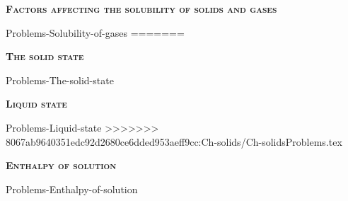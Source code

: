 \documentclass[main.tex]{subfiles}
\newcommand\chapterlabel{Ch-solids}
\begin{document}
\begin{multicols*}{2}
{\raggedright\textsc{\textbf{Factors affecting the solubility of solids and gases }}\par}
{Problems-Solubility-of-gases}
=======
{\raggedright\textsc{\textbf{The solid state }}\par}
{Problems-The-solid-state}
{\raggedright\textsc{\textbf{Liquid state }}\par}
{Problems-Liquid-state}
>>>>>>> 8067ab9640351edc92d2680ce6dded953aeff9cc:Ch-solids/Ch-solidsProblems.tex

{\raggedright\textsc{\textbf{Enthalpy of solution }}\par}
{Problems-Enthalpy-of-solution}


\end{multicols*} \iftoggle{showfinalanswers}{
\newpage\fancyhfoffset[E,O]{0pt}
\begin{answerbox}
\begin{answersenvironment}
 \begin{localsize}{10}
{ \checkoddpage\ifoddpage    \else   \clearpage\thispagestyle{empty}\mbox{}\clearpage\fi
\Large \bf Answers}
\SetupExSheets{ headings = inline-nr , counter-format = qu) ,}
\printsolutions 
  \vspace{20cm}
 \end{localsize}
 \end{answersenvironment}
\end{answerbox}
}{}
\checkoddpage\ifoddpage   \clearpage\thispagestyle{empty}\mbox{}\clearpage \else   \fi
\end{document}

